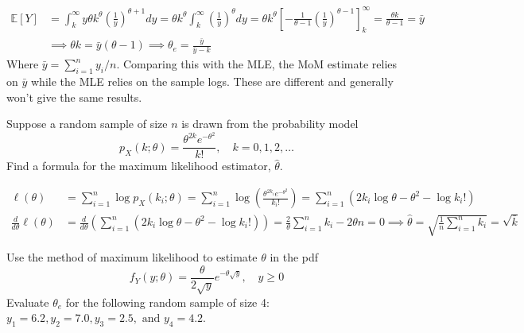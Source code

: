 \documentclass{article}
\newcommand{\E}{\mathbb{E}}
\begin{document}
\begin{probset}
\begin{prob}
\begin{subprobset}
\begin{subprob}
            \begin{soln}
                \begin{align*}
                    \E[Y] &= \int_k^\infty y \theta k^\theta \left( \frac{1}{y} \right)^{\theta+1} dy = \theta k^\theta \int_k^\infty \left( \frac{1}{y} \right)^{\theta} dy = \theta k^\theta \left[ -\frac{1}{\theta - 1} \left( \frac{1}{y} \right)^{\theta - 1} \right]_k^\infty = \frac{\theta k}{\theta - 1} = \bar{y} \\
                    &\implies \theta k = \bar{y} (\theta - 1) \implies \theta_e = \frac{\bar{y}}{\bar{y} - k}
                \end{align*}
                Where $\bar{y} = \sum_{i=1}^n y_i / n$. Comparing this with the MLE, the MoM estimate relies on $\bar{y}$ while the MLE relies on the sample logs. These are different and generally won't give the same results.
            \end{soln}
        \end{subprob}
    \end{subprobset}
\end{prob}

\newpage

\begin{prob}[\textbf{5.2.4}]
    Suppose a random sample of size $n$ is drawn from the probability model
    \[
        p_X(k; \theta) = \frac{\theta^{2k} e^{-\theta^2}}{k!}, \quad k = 0, 1, 2, \ldots
    \]
    Find a formula for the maximum likelihood estimator, $\hat\theta$.

    \begin{soln}
        \begin{align*}
            \ell(\theta) &= \sum_{i=1}^n \log p_X(k_i; \theta) = \sum_{i=1}^n \log \left( \frac{\theta^{2k_i} e^{-\theta^2}}{k_i!} \right) = \sum_{i=1}^n (2k_i \log \theta - \theta^2 - \log k_i!) \\
            \frac{d}{d\theta} \ell(\theta) &= \frac{d}{d\theta} \left( \sum_{i=1}^n (2k_i \log \theta - \theta^2 - \log k_i!) \right) = \frac{2}{\theta} \sum_{i=1}^n k_i - 2\theta n = 0 \implies \hat\theta = \sqrt{\frac{1}{n}\sum_{i=1}^n k_i} = \sqrt{\bar{k}}
        \end{align*}
    \end{soln}
\end{prob}

\begin{prob}[\textbf{5.2.6}]
    Use the method of maximum likelihood to estimate $\theta$ in the pdf
    \[
        f_Y(y; \theta) = \frac{\theta}{2\sqrt{y}} e^{-\theta \sqrt{y}}, \quad y \geq 0
    \]
    Evaluate $\theta_e$ for the following random sample of size 4: $y_1 = 6.2, y_2 = 7.0, y_3 = 2.5, \text{ and } y_4 = 4.2$.


\end{prob}
\end{probset}
\end{document}

